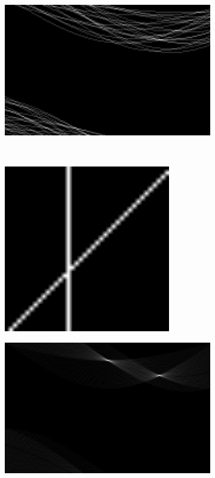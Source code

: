 \documentclass[12pt
,headinclude
,headsepline
,bibtotocnumbered
]{scrartcl}
\begin{document}
\begin{figure}[h]
\begin{subfigure}{0.45\textwidth}
    \end{subfigure}
    \hfill
    \begin{subfigure}{0.45\textwidth}
        \includegraphics[width=1.25\textwidth]{plots/test3_hough.png}
    \end{subfigure}\\
    \begin{subfigure}{0.45\textwidth}
        \includegraphics[width=0.8\textwidth]{plots/test4.png}
    \end{subfigure}
    \hfill
    \begin{subfigure}{0.45\textwidth}
        \includegraphics[width=1.25\textwidth]{plots/test4_hough.png}

\end{subfigure}
\end{figure}
\end{document}

